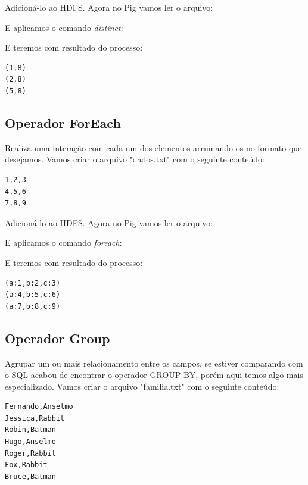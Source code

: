 \documentclass[a4paper,11pt]{article}
\begin{document}
Adicioná-lo ao HDFS. Agora no Pig vamos ler o arquivo: \\

E aplicamos o comando \textit{distinct}: \\

E teremos com resultado do processo:
\begin{lstlisting}[]
(1,8)
(2,8)
(5,8)
\end{lstlisting}

\subsection{Operador ForEach}
Realiza uma interação com cada um dos elementos arrumando-os no formato que desejamos. Vamos criar o arquivo "dados.txt" com o seguinte conteúdo:
\begin{lstlisting}[]
1,2,3
4,5,6
7,8,9
\end{lstlisting}

Adicioná-lo ao HDFS. Agora no Pig vamos ler o arquivo: \\

E aplicamos o comando \textit{foreach}: \\

E teremos com resultado do processo:
\begin{lstlisting}[]
(a:1,b:2,c:3)
(a:4,b:5,c:6)
(a:7,b:8,c:9)
\end{lstlisting}

\subsection{Operador Group}
Agrupar um ou mais relacionamento entre os campos, se estiver comparando com o SQL acabou de encontrar o operador GROUP BY, porém aqui temos algo mais especializado. Vamos criar o arquivo "familia.txt" com o seguinte conteúdo:
\begin{lstlisting}[]
Fernando,Anselmo
Jessica,Rabbit
Robin,Batman
Hugo,Anselmo
Roger,Rabbit
Fox,Rabbit
Bruce,Batman
\end{lstlisting}
\end{document}
